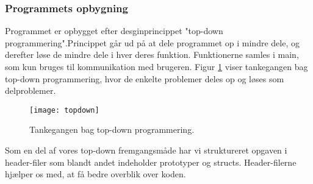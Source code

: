 \subsubsection{Programmets opbygning}

Programmet er opbygget efter desginprincippet "top-down programmering".Princippet går ud på at dele programmet op i mindre dele, og derefter løse de mindre dele i hver deres funktion. Funktionerne samles i main, som kun bruges til kommunikation med brugeren. Figur \ref{fig:topdown} viser tankegangen bag top-down programmering, hvor de enkelte problemer deles op og løses som delproblemer. 

\begin{figure}[H]
    \centering
    \texttt{[image: topdown]}
    \caption{Tankegangen bag top-down programmering.}
    \label{fig:topdown}
\end{figure}

Som en del af vores top-down fremgangsmåde har vi struktureret opgaven i header-filer som blandt andet indeholder prototyper og structs. Header-filerne hjælper os med, at få bedre overblik over koden. 

